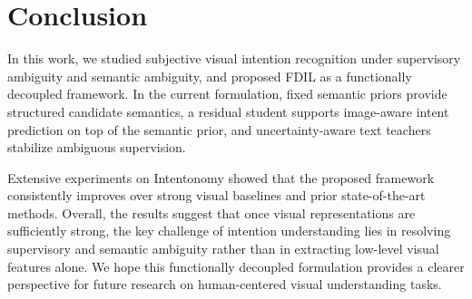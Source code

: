 \section{Conclusion}
\label{sec:conclusion}

In this work, we studied subjective visual intention recognition under supervisory ambiguity and semantic ambiguity, and proposed FDIL as a functionally decoupled framework. In the current formulation, fixed semantic priors provide structured candidate semantics, a residual student supports image-aware intent prediction on top of the semantic prior, and uncertainty-aware text teachers stabilize ambiguous supervision.

Extensive experiments on Intentonomy showed that the proposed framework consistently improves over strong visual baselines and prior state-of-the-art methods. Overall, the results suggest that once visual representations are sufficiently strong, the key challenge of intention understanding lies in resolving supervisory and semantic ambiguity rather than in extracting low-level visual features alone. We hope this functionally decoupled formulation provides a clearer perspective for future research on human-centered visual understanding tasks.
